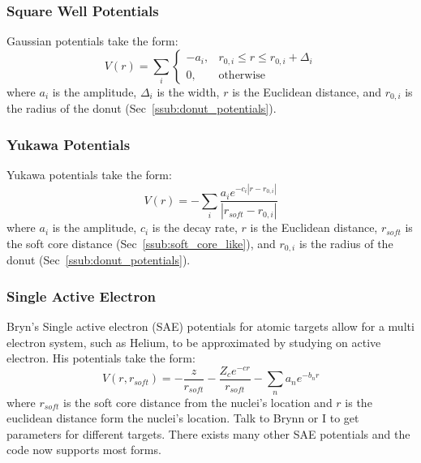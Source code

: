 \documentclass{article}
\begin{document}
\subsubsection{Square Well Potentials} %
\label{ssub:square_well_potentials}
Gaussian potentials take the form:
\begin{equation}
V(r) = \sum\limits_i
  \begin{cases}
        -a_i, & r_{0,i} \le r \le r_{0,i} + \Delta_i\\
        0, & \text{otherwise}
    \end{cases}
  \label{eq:square_well}
\end{equation}
where $a_i$ is the amplitude, $\Delta_i$ is the width, $r$ is the Euclidean distance, and $r_{0,i}$ is the radius of the donut (Sec~\ref{ssub:donut_potentials}).


\subsubsection{Yukawa Potentials} %
\label{ssub:yukawa_potentials}
Yukawa potentials take the form:
\begin{equation}
  V(r) = - \sum\limits_i \frac{a_i e^{-c_i |r-r_{0,i}|}}{|r_{soft}-r_{0,i}|}
  \label{eq:yukawa}
\end{equation}
where $a_i$ is the amplitude, $c_i$ is the decay rate, $r$ is the Euclidean distance, $r_{soft}$ is the soft core distance (Sec~\ref{ssub:soft_core_like}), and $r_{0,i}$ is the radius of the donut (Sec~\ref{ssub:donut_potentials}).

\subsubsection{Single Active Electron} %
\label{ssub:single_active_electron}
Bryn's Single active electron (SAE) potentials for atomic targets allow for a multi electron system, such as Helium, to be approximated by studying on active electron. His potentials take the form:
\begin{equation}
  V(r, r_{soft}) = - \frac{z}{r_{soft}} - \frac{Z_c e^{-c r}}{r_{soft}} - \sum_n a_n e^{-b_n r}
    \label{eq:SAE}
\end{equation}
where $r_{soft}$ is the soft core distance from the nuclei's location and $r$ is the euclidean distance form the nuclei's location. Talk to Brynn or I to get parameters for different targets. There exists many other SAE potentials and the code now supports most forms.
\end{document}
